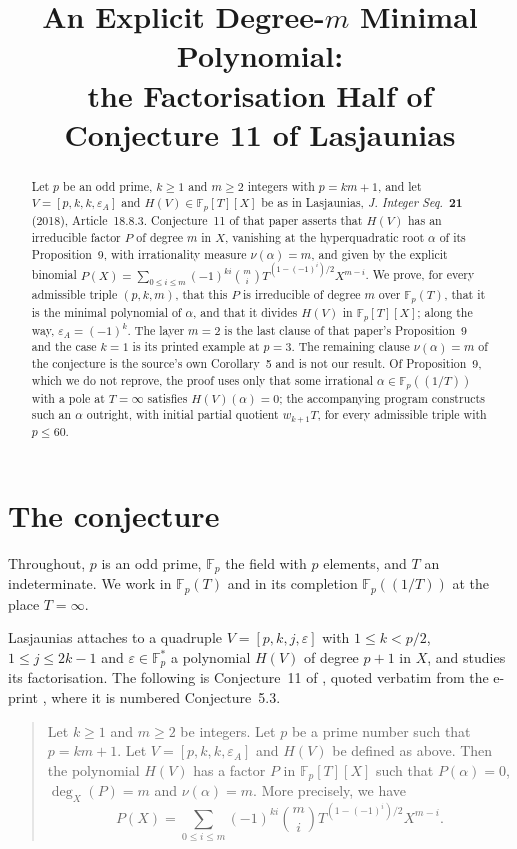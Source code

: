 \documentclass[11pt]{amsart}
\title[A degree-$m$ minimal polynomial]
{An Explicit Degree-$m$ Minimal Polynomial:\\ the Factorisation Half of
Conjecture 11 of Lasjaunias}
\date{}
\theoremstyle{remark}
\newcommand{\Fp}{\mathbb F_p}
\newcommand{\HV}{H(V)}
\begin{document}
\begin{abstract}
Let $p$ be an odd prime, $k\ge1$ and $m\ge2$ integers with $p=km+1$, and let
$V=[p,k,k,\varepsilon_A]$ and $\HV\in\Fp[T][X]$ be as in Lasjaunias, \emph{J. Integer
Seq.}~\textbf{21} (2018), Article~18.8.3. Conjecture~11 of that paper asserts that $\HV$ has an
irreducible factor $P$ of degree $m$ in $X$, vanishing at the hyperquadratic root $\alpha$ of its
Proposition~9, with irrationality measure $\nu(\alpha)=m$, and given by the explicit binomial
$P(X)=\sum_{0\le i\le m}(-1)^{ki}\binom{m}{i}T^{(1-(-1)^i)/2}X^{m-i}$. We prove, for every
admissible triple $(p,k,m)$, that this $P$ is irreducible of degree $m$ over $\Fp(T)$, that it is
the minimal polynomial of $\alpha$, and that it divides $\HV$ in $\Fp[T][X]$; along the way,
$\varepsilon_A=(-1)^k$. The layer $m=2$ is the last clause of that paper's Proposition~9 and the
case $k=1$ is its printed example at $p=3$. The remaining clause $\nu(\alpha)=m$ of the conjecture
is the source's own Corollary~5 and is not our result. Of Proposition~9, which we do not reprove, the
proof uses only that some irrational $\alpha\in\Fp((1/T))$ with a pole at $T=\infty$ satisfies
$\HV(\alpha)=0$; the accompanying program constructs such an $\alpha$ outright, with initial partial
quotient $w_{k+1}T$, for every admissible triple with $p\le60$.
\end{abstract}

\maketitle

\section{The conjecture}\label{sec:conj}

Throughout, $p$ is an odd prime, $\Fp$ the field with $p$ elements, and $T$ an indeterminate. We
work in $\Fp(T)$ and in its completion $\Fp((1/T))$ at the place $T=\infty$.

Lasjaunias \cite{L} attaches to a quadruple $V=[p,k,j,\varepsilon]$ with
$1\le k<p/2$, $1\le j\le 2k-1$ and $\varepsilon\in\Fp^*$ a polynomial $\HV$ of degree $p+1$ in $X$,
and studies its factorisation. The following is Conjecture~11 of \cite{L}, quoted verbatim from the
e-print \cite{Lep}, where it is numbered Conjecture~5.3.

\begin{quote}
Let $k\ge1$ and $m\ge2$ be integers. Let $p$ be a prime number such that $p=km+1$. Let
$V=[p,k,k,\varepsilon_A]$ and $H(V)$ be defined as above. Then the polynomial $H(V)$ has a factor
$P$ in $\Fp[T][X]$ such that $P(\alpha)=0$, $\deg_X(P)=m$ and $\nu(\alpha)=m$. More precisely, we
have
\begin{equation}\label{eq:P}
 P(X)=\sum_{0\le i\le m}(-1)^{ki}\binom{m}{i}T^{(1-(-1)^i)/2}X^{m-i}.
\end{equation}
\end{quote}
\end{document}
